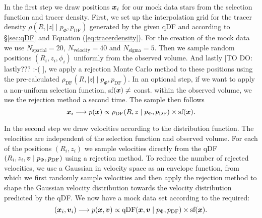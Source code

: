 In the first step we draw positions $\boldsymbol{x}_i$ for our mock data stars from the selection function and tracer density. First, we set up the interpolation grid for the tracer density $\rho(R,|z| \mid p_\Phi, p_\text{DF})$ generated by the given qDF and according to \S\ref{sec:qDF} and Equation (\ref{eq:tracerdensity}). For the creation of the mock data we use $N_\text{spatial} = 20$, $N_\text{velocity} = 40$ and $N_\text{sigma}=5$. Then we sample random positions $(R_i,z_i,\phi_i)$ uniformly from the observed volume. And lastly [TO DO: lastly??? :-( ], we apply a rejection Monte Carlo method to these positions using the pre-calculated $\rho_\text{DF}(R,|z| \mid p_{\Phi},p_\text{DF})$. In an optional step, if we want to apply a non-uniform selection function, sf$(\boldsymbol{x}) \neq $ const. within the observed volume, we use the rejection method a second time. The sample then follows 
\begin{equation*}
\boldsymbol{x}_i \longrightarrow p(\boldsymbol{x}) \propto \rho_\text{DF}(R,z \mid p_{\Phi},p_\text{DF}) \times \text{sf}(\boldsymbol{x}).
\end{equation*}

In the second step we draw velocities according to the distribution function. The velocities are independent of the selection function and observed volume. For each of the positions $(R_i,z_i)$ we sample velocities directly from the qDF$(R_i,z_i,\boldsymbol{v} \mid p_{\Phi},p_\text{DF})$ using a rejection method. To reduce the number of rejected velocities, we use a Gaussian in velocity space as an envelope function, from which we first randomly sample velocities and then apply the rejection method to shape the Gaussian velocity distribution towards the velocity distribution predicted by the qDF. We now have a mock data set according to the required:
\begin{equation*}
(\boldsymbol{x}_i,\boldsymbol{v}_i) \longrightarrow p(\boldsymbol{x},\boldsymbol{v}) \propto \text{qDF}(\boldsymbol{x},\boldsymbol{v} \mid p_{\Phi},p_\text{DF}) \times \text{sf}(\boldsymbol{x}).
\end{equation*} 


